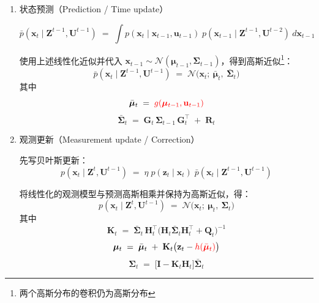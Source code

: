 \documentclass[../main.tex]{subfiles}
\begin{document}
\begin{enumerate}
{{\begin{enumerate}
    $$
    \mathbf{z}_t \;=\; \textcolor{red}{h(\mathbf{x}_t)} \;+\; \boldsymbol{\omega}_t,\qquad \boldsymbol{\omega}_t\sim\mathcal{N}(\mathbf{0},\mathbf{Q}_t)
    $$
    
    取泰勒展开参数为 $\bar{\boldsymbol{\mu}}_t$，有
    $$
    h(\mathbf{x}_t) \approx \textcolor{red}{h(\bar{\boldsymbol{\mu}}_t)} \;+\; \mathbf{H}_t(\mathbf{x}_t - \bar{\boldsymbol{\mu}}_t)
    $$
    $$
    \mathbf{H}_t \;=\; \left.\frac{\partial h(\mathbf{x}_t)}{\partial \mathbf{x}_t}\right|_{\mathbf{x}_t=\bar{\boldsymbol{\mu}}_t}
    \qquad\text{(Jacobian 矩阵, } k\times n\text{)}
    $$
    
    因而
    $$
    p(\mathbf{z}_t\mid \mathbf{x}_t)\approx \mathcal{N}\big(\mathbf{z}_t;\ \textcolor{red}{h(\bar{\boldsymbol{\mu}}_t)} + \mathbf{H}_t(\mathbf{x}_t-\bar{\boldsymbol{\mu}}_t),\ \mathbf{Q}_t\big)
    $$
    
    \item 状态预测（Prediction / Time update）
    
    $$
    \bar{p}(\mathbf{x}_t\mid \mathbf{Z}^{t-1},\mathbf{U}^{t-1})
    \;=\;\int p(\mathbf{x}_t\mid \mathbf{x}_{t-1},\mathbf{u}_{t-1})\; p(\mathbf{x}_{t-1}\mid \mathbf{Z}^{t-1},\mathbf{U}^{t-2})\ d\mathbf{x}_{t-1}
    $$
    
    使用上述线性化近似并代入 $\mathbf{x}_{t-1}\sim\mathcal{N}(\boldsymbol{\mu}_{t-1},\boldsymbol{\Sigma}_{t-1})$，得到高斯近似\footnote{两个高斯分布的卷积仍为高斯分布}：
    $$
    \bar{p}(\mathbf{x}_t\mid \mathbf{Z}^{t-1},\mathbf{U}^{t-1}) \;=\; \mathcal{N}\big(\mathbf{x}_t;\ \bar{\boldsymbol{\mu}}_t,\ \bar{\boldsymbol{\Sigma}}_t\big)
    $$
    其中
    $$
    \bar{\boldsymbol{\mu}}_t \;=\; \textcolor{red}{g(\boldsymbol{\mu}_{t-1},\mathbf{u}_{t-1})}
    $$
    $$
    \bar{\boldsymbol{\Sigma}}_t \;=\; \mathbf{G}_t\,\boldsymbol{\Sigma}_{t-1}\,\mathbf{G}_t^\top \;+\; \mathbf{R}_t
    $$
    
    \item 观测更新（Measurement update / Correction）
    
    先写贝叶斯更新：
    $$
    p(\mathbf{x}_t\mid \mathbf{Z}^t,\mathbf{U}^{t-1}) \;=\; \eta\; p(\mathbf{z}_t\mid \mathbf{x}_t)\; \bar{p}(\mathbf{x}_t\mid \mathbf{Z}^{t-1},\mathbf{U}^{t-1})
    $$
    
    将线性化的观测模型与预测高斯相乘并保持为高斯近似，得：
    $$
    p(\mathbf{x}_t\mid \mathbf{Z}^t,\mathbf{U}^{t-1}) \;=\; \mathcal{N}\big(\mathbf{x}_t;\ \boldsymbol{\mu}_t,\ \boldsymbol{\Sigma}_t\big)
    $$
    其中
    $$
    \mathbf{K}_t \;=\; \bar{\boldsymbol{\Sigma}}_t \,\mathbf{H}_t^\top \big(\mathbf{H}_t \bar{\boldsymbol{\Sigma}}_t \mathbf{H}_t^\top + \mathbf{Q}_t\big)^{-1}
    $$
    $$
    \boldsymbol{\mu}_t \;=\; \bar{\boldsymbol{\mu}}_t \;+\; \mathbf{K}_t\big(\mathbf{z}_t - \textcolor{red}{h(\bar{\boldsymbol{\mu}}_t)}\big)
    $$
    $$
    \boldsymbol{\Sigma}_t \;=\; \big[\mathbf{I} - \mathbf{K}_t \mathbf{H}_t\big] \bar{\boldsymbol{\Sigma}}_t
    $$
    

\end{enumerate}}}
\end{enumerate}
\end{document}
